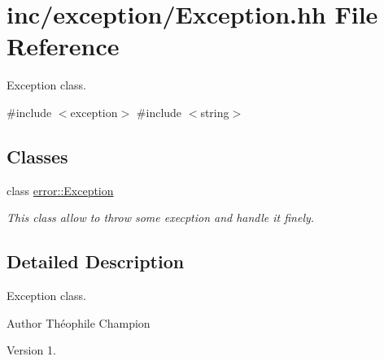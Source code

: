 \hypertarget{Exception_8hh}{}\section{inc/exception/\+Exception.hh File Reference}
\label{Exception_8hh}


Exception class.  


{\ttfamily \#include $<$exception$>$}\newline
{\ttfamily \#include $<$string$>$}\newline
\subsection*{Classes}
\begin{DoxyCompactItemize}
\item 
class \hyperlink{classerror_1_1Exception}{error\+::\+Exception}
\begin{DoxyCompactList}\small\item\em This class allow to throw some execption and handle it finely. \end{DoxyCompactList}\end{DoxyCompactItemize}


\subsection{Detailed Description}
Exception class. 

\begin{DoxyAuthor}{Author}
Théophile Champion 
\end{DoxyAuthor}
\begin{DoxyVersion}{Version}
1. 
\end{DoxyVersion}
